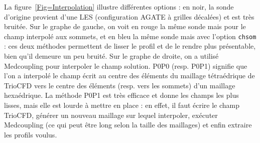 La figure~\ref{Fig=Interpolation} illustre diff\'erentes options : en noir, la sonde d'origine provient d'une LES (configuration AGATE \`a grilles d\'ecal\'ees) et est tr\`es bruit\'ee. Sur le graphe de gauche, on voit en rouge la m\^eme sonde mais pour le champ interpol\'e aux sommets, et en bleu la m\^eme sonde mais avec l'option \texttt{chsom} : ces deux m\'ethodes permettent de lisser le profil et de le rendre plus pr\'esentable, bien qu'il demeure un peu bruit\'e. Sur le graphe de droite, on a utilis\'e Medcoupling pour interpoler le champ solution. P0P0 (resp. P0P1) signifie que l'on a interpol\'e le champ \'ecrit au centre des \'el\'ements du maillage t\'etra\'edrique de TrioCFD vers le centre des \'el\'ements (resp. vers les sommets) d'un maillage hexa\'edrique. La m\'ethode P0P1 est tr\`es efficace et donne les champs les plus lisses, mais elle est lourde \`a mettre en place : en effet, il faut \'ecrire le champ TrioCFD, g\'en\'erer un nouveau maillage sur lequel interpoler, ex\'ecuter Medcoupling (ce qui peut \^etre long selon la taille des maillages) et enfin extraire les profils voulus.

